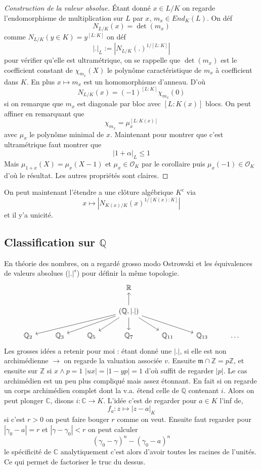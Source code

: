 \documentclass[a4paper,12pt]{book}
\newcommand{\Z}{\mathbb{Z}}
\newcommand{\Q}{\mathbb{Q}}
\newcommand{\C}{\mathbb{C}}
\newcommand{\Or}{\mathcal{O}}
\newcommand{\m}{\mathfrak m}
\theoremstyle{plain}
\theoremstyle{definition}
\theoremstyle{remark}
\begin{document}
\begin{proof}[Construction de la valeur absolue]
    
Étant donné $x\in L/K$ on regarde 
l'endomorphisme de multiplication sur $L$ par $x$, $m_x\in End_K(L)$.
On déf 
\[N_{L/K}(x)=\det(m_x)\]
comme $N_{L/K}(y\in K)=y^{[L:K]}$ on déf 
\[|.|_L:=|N_{L/K}(.)^{1/[L:K]}|\]
pour vérifier qu'elle est ultramétrique, on se rappelle que $\det(m_x)$
est le coefficient constant de $\chi_{m_x}(X)$ le polynôme 
caractéristique de $m_x$ à coefficient dans $K$. En plus 
$x\mapsto m_x$ est un homomorphisme d'anneau. D'où 
\[N_{L/K}(x)=(-1)^{[L:K]}\chi_{m_x}(0)\]
si on remarque que $m_x$ est diagonale par bloc avec $[L:K(x)]$
blocs. On peut affiner en remarquant que 
\[\chi_{m_x}=\mu_{x}^{[L:K(x)]}\]
avec $\mu_x$ le polynôme minimal de $x$. Maintenant pour montrer que
c'est ultramétrique faut montrer que 
\[|1+\alpha|_L\leq 1\]
Mais $\mu_{1+x}(X)=\mu_{x}(X-1)$ et $\mu_x\in \Or_K$ par le corollaire 
puis $\mu_x(-1)\in \Or_K$ d'où le résultat. Les autres propriétés sont
claires.
\end{proof}
On peut maintenant l'étendre a une clôture algébrique $K^c$ via
\[x\mapsto |N_{K(x)/K}(x)^{1/[K(x):K]}|\]
et il y'a unicité.

\subsection{Classification sur $\Q$}
En théorie des nombres, on a regardé grosso modo Ostrowski et les 
équivalences de valeurs absolues ($|.|^s$) pour définir la même 
topologie.
\[\begin{tikzcd}
	&&& {\mathbb R} \\
	&&& {(\mathbb Q,|.|)} \\
    {\mathbb Q_{2}} & {\mathbb Q_{3}} & {\mathbb Q_{5}} & {\mathbb Q_{7}} & {\mathbb Q_{11}} & {\mathbb Q_{13}} & \ldots
	\arrow[from=2-4, to=1-4]
	\arrow[from=2-4, to=3-1]
	\arrow[from=2-4, to=3-2]
	\arrow[from=2-4, to=3-3]
	\arrow[from=2-4, to=3-4]
	\arrow[from=2-4, to=3-5]
	\arrow[from=2-4, to=3-6]
\end{tikzcd}\]
Les grosses idées a retenir pour moi : étant donné une $|.|$, si
elle est non archimédienne $\to$ on regarde la valuation associée $v$. 
Ensuite $\m\cap \Z=p\Z$, et ensuite sur $\Z$ si $x\wedge p=1$
$|ux|=|1-yp|=1$ d'où suffit de regarder $|p|$. Le cas archimédien est 
un peu plus compliqué mais assez étonnant. En fait si on regarde un corps
archimédien complet dont la v.a. étend celle de $\Q$ contenant $i$.
Alors on peut plonger $\C$, disons $i\colon \C\to K$. L'idée c'est de
regarder pour $a\in K$ l'inf de,
\[f_a\colon z\mapsto |z-a|_K\]
si c'est $r>0$ on peut faire bouger $r$ comme on veut. Ensuite faut 
regarder pour $|\gamma_0 - a|=r$ et $|\gamma - \gamma_0|<r$ on peut 
calculer 
\[(\gamma_0-\gamma)^n - (\gamma_0 - a)^n\]
le spécificité de $\C$ analytiquement c'est alors d'avoir toutes
les racines de l'unités. Ce qui permet de factoriser le truc du dessus.
\end{document}
